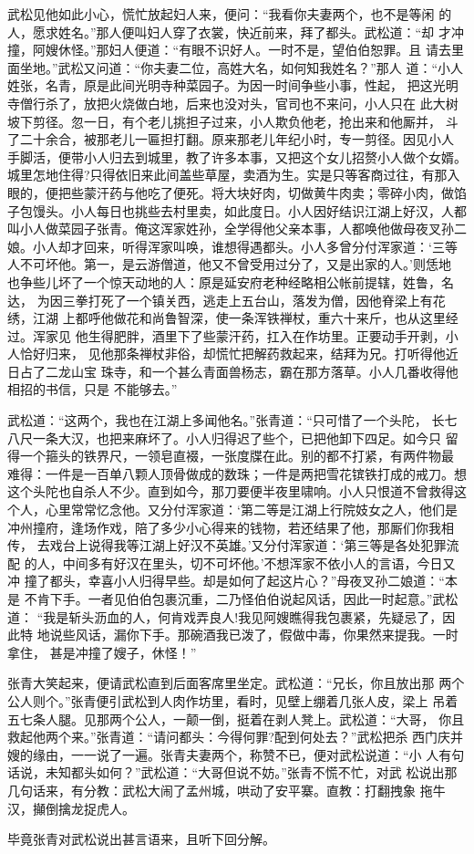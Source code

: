 武松见他如此小心，慌忙放起妇人来，便问：“我看你夫妻两个，也不是等闲
的人，愿求姓名。”那人便叫妇人穿了衣裳，快近前来，拜了都头。武松道：“却
才冲撞，阿嫂休怪。”那妇人便道：“有眼不识好人。一时不是，望伯伯恕罪。且
请去里面坐地。”武松又问道：“你夫妻二位，高姓大名，如何知我姓名？”那人
道：“小人姓张，名青，原是此间光明寺种菜园子。为因一时间争些小事，性起，
把这光明寺僧行杀了，放把火烧做白地，后来也没对头，官司也不来问，小人只在
此大树坡下剪径。忽一日，有个老儿挑担子过来，小人欺负他老，抢出来和他厮并，
斗了二十余合，被那老儿一匾担打翻。原来那老儿年纪小时，专一剪径。因见小人
手脚活，便带小人归去到城里，教了许多本事，又把这个女儿招赘小人做个女婿。
城里怎地住得?只得依旧来此间盖些草屋，卖酒为生。实是只等客商过往，有那入
眼的，便把些蒙汗药与他吃了便死。将大块好肉，切做黄牛肉卖；零碎小肉，做馅
子包馒头。小人每日也挑些去村里卖，如此度日。小人因好结识江湖上好汉，人都
叫小人做菜园子张青。俺这浑家姓孙，全学得他父亲本事，人都唤他做母夜叉孙二
娘。小人却才回来，听得浑家叫唤，谁想得遇都头。小人多曾分付浑家道：‘三等
人不可坏他。第一，是云游僧道，他又不曾受用过分了，又是出家的人。’则恁地
也争些儿坏了一个惊天动地的人：原是延安府老种经略相公帐前提辖，姓鲁，名达，
为因三拳打死了一个镇关西，逃走上五台山，落发为僧，因他脊梁上有花绣，江湖
上都呼他做花和尚鲁智深，使一条浑铁禅杖，重六十来斤，也从这里经过。浑家见
他生得肥胖，酒里下了些蒙汗药，扛入在作坊里。正要动手开剥，小人恰好归来，
见他那条禅杖非俗，却慌忙把解药救起来，结拜为兄。打听得他近日占了二龙山宝
珠寺，和一个甚么青面兽杨志，霸在那方落草。小人几番收得他相招的书信，只是
不能够去。”

武松道：“这两个，我也在江湖上多闻他名。”张青道：“只可惜了一个头陀，
长七八尺一条大汉，也把来麻坏了。小人归得迟了些个，已把他卸下四足。如今只
留得一个箍头的铁界尺，一领皂直裰，一张度牒在此。别的都不打紧，有两件物最
难得：一件是一百单八颗人顶骨做成的数珠；一件是两把雪花镔铁打成的戒刀。想
这个头陀也自杀人不少。直到如今，那刀要便半夜里啸响。小人只恨道不曾救得这
个人，心里常常忆念他。又分付浑家道：‘第二等是江湖上行院妓女之人，他们是
冲州撞府，逢场作戏，陪了多少小心得来的钱物，若还结果了他，那厮们你我相传，
去戏台上说得我等江湖上好汉不英雄。’又分付浑家道：‘第三等是各处犯罪流配
的人，中间多有好汉在里头，切不可坏他。’不想浑家不依小人的言语，今日又冲
撞了都头，幸喜小人归得早些。却是如何了起这片心？”母夜叉孙二娘道：“本是
不肯下手。一者见伯伯包裹沉重，二乃怪伯伯说起风话，因此一时起意。”武松道：
“我是斩头沥血的人，何肯戏弄良人!我见阿嫂瞧得我包裹紧，先疑忌了，因此特
地说些风话，漏你下手。那碗酒我已泼了，假做中毒，你果然来提我。一时拿住，
甚是冲撞了嫂子，休怪！”

张青大笑起来，便请武松直到后面客席里坐定。武松道：“兄长，你且放出那
两个公人则个。”张青便引武松到人肉作坊里，看时，见壁上绷着几张人皮，梁上
吊着五七条人腿。见那两个公人，一颠一倒，挺着在剥人凳上。武松道：“大哥，
你且救起他两个来。”张青道：“请问都头：今得何罪?配到何处去？”武松把杀
西门庆并嫂的缘由，一一说了一遍。张青夫妻两个，称赞不已，便对武松说道：“小
人有句话说，未知都头如何？”武松道：“大哥但说不妨。”张青不慌不忙，对武
松说出那几句话来，有分教：武松大闹了孟州城，哄动了安平寨。直教：打翻拽象
拖牛汉，攧倒擒龙捉虎人。

毕竟张青对武松说出甚言语来，且听下回分解。